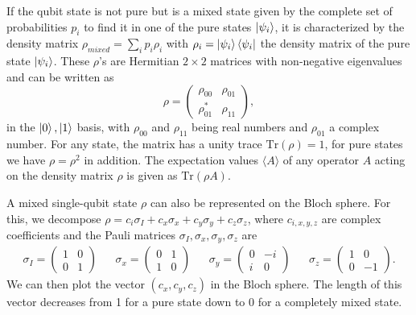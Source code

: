 \smallskip

\smallskip
If the qubit state is not pure but is a mixed state given by the complete set of probabilities ${p_{i}}$ to find it in one of the pure states  ${\left| \psi_{i} \right>}$, it is characterized by the density matrix $\rho_{mixed} = \sum\limits_i p_i \rho_i$ with $\rho_i=\left| \psi_{i} \right>\left< \psi_{i} \right|$ the density matrix of the pure state $\left| \psi_i \right>$. These $\rho$'s are Hermitian $2\times 2$ matrices with non-negative eigenvalues and can be written as
%
\begin{equation}
\rho = \left( \begin{array}{cc} \rho_{00} & \rho_{01} \\ \rho_{01}^* & \rho_{11} \end{array} \right),
\end{equation}
%
in the ${\left| 0 \right>,\left| 1 \right>}$ basis, with $\rho_{00}$ and $\rho_{11}$ being real numbers and $\rho_{01}$ a complex number. For any state, the matrix has a unity trace $\mathrm{Tr}(\rho)=1$, for pure states we have $\rho=\rho^2$ in addition. The expectation values $\langle A \rangle$ of any operator $A$ acting on the density matrix $\rho$ is given as $\mathrm{Tr}(\rho A)$.

\smallskip

A mixed single-qubit state $\rho$ can also be represented on the Bloch sphere. For this, we decompose $\rho = c_i\sigma_I+c_x\sigma_x+c_y\sigma_y+c_z\sigma_z$, where $c_{i,x,y,z}$ are complex coefficients and the Pauli matrices $\sigma_I,\sigma_x,\sigma_y,\sigma_z$ are
%
\begin{align}
  \sigma_I  =  \left( \begin{array}{cc} 1 & 0 \\ 0 & 1 \end{array} \right)
 & &  \sigma_x  =  \left( \begin{array}{cc} 0 & 1 \\ 1 & 0 \end{array} \right)
  & & \sigma_y  =  \left( \begin{array}{cc} 0 & -i \\ i  &  0\end{array} \right)
  & & \sigma_z  =  \left( \begin{array}{cc} 1 & 0 \\ 0 & -1 \end{array} \right).
\label{eq:pauli_operators}
\end{align}
% 
We can then plot the vector $(c_x,c_y,c_z)$ in the Bloch sphere. The length of this vector decreases from 1 for a pure state down to 0 for a completely mixed state.

